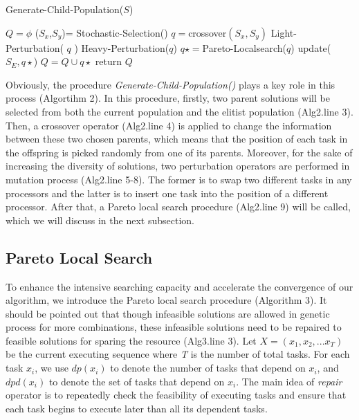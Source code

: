 \begin{algorithm}
\caption{Generate-Child-Population($S$)}
\label{alg2}
\begin{algorithmic} [1]
\State $Q=\phi$
\State ($S_x$,$S_y$)= Stochastic-Selection()
\State $q=$crossover$(S_x,S_y)$
\State Light-Perturbation( $ q $ )
\State Heavy-Perturbation($ q $)
\EndIf
\State $q\star = $Pareto-Localsearch($q$)
\State update($S_E,q\star$)
\State $Q=Q \cup q\star$
\EndWhile
\State return $Q$
\end{algorithmic}
\end{algorithm}

Obviously, the procedure \textit{Generate-Child-Population()} plays a key role in this process (Algortihm 2). In this procedure, firstly, two parent solutions will be selected from both the current population and the elitist population (Alg2.line 3). Then, a crossover operator (Alg2.line 4) is applied to change the information between these two chosen parents, which means that the position of each task in the offspring is picked randomly from one of its parents. Moreover, for the sake of increasing the diversity of solutions, two perturbation operators are performed in mutation process (Alg2.line 5-8). The former is to swap two different tasks in any processors and the latter is to insert one task into the position of a different processor. After that, a Pareto local search procedure (Alg2.line 9)  will be called, which we will discuss in the next subsection.


\subsection{Pareto Local Search}
To enhance the intensive searching capacity and accelerate the convergence of our algorithm,  we  introduce the Pareto local search procedure (Algorithm 3). It should be pointed out that though infeasible solutions are allowed in genetic process for more combinations, these infeasible solutions need to be repaired to feasible solutions for sparing the resource (Alg3.line 3).
Let $ X=(x_1,x_2,...x_T) $ be the current executing sequence where \textit{T} is the number of total tasks. For each task $ x_i $, we use $ dp(x_i)$ to denote the number of tasks that depend on $ x_i $, and $ dpd(x_i)$ to denote the set of tasks that depend on $ x_i $. The main idea of \textit{repair} operator is to repeatedly check the feasibility of executing tasks and ensure that each task begins to execute later than all its dependent tasks.

